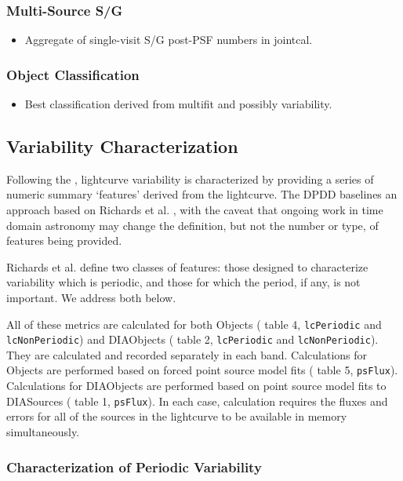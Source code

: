 \subsubsection{Multi-Source S/G}
\label{sec:acJointCalClassification}
\begin{itemize}
\item Aggregate of single-visit S/G post-PSF numbers in jointcal.
\end{itemize}
\subsubsection{Object Classification}
\label{sec:acObjectClassification}
\begin{itemize}
\item Best classification derived from multifit and possibly variability.
\end{itemize}

\subsection{Variability Characterization}
\label{sec:acVariabilityCharacterization}

Following the \DPDD{}, lightcurve variability is characterized by providing a series of numeric summary `features' derived from the lightcurve. The DPDD baselines an approach based on Richards et al. \cite{Richards11}, with the caveat that ongoing work in time domain astronomy may change the definition, but not the number or type, of features being provided.

Richards et al. define two classes of features: those designed to characterize variability which is periodic, and those for which the period, if any, is not important. We address both below.

All of these metrics are calculated for both Objects (\DPDD{} table 4, \texttt{lcPeriodic} and \texttt{lcNonPeriodic}) and DIAObjects (\DPDD{} table 2, \texttt{lcPeriodic} and \texttt{lcNonPeriodic}). They are calculated and recorded separately in each band. Calculations for Objects are performed based on forced point source model fits (\DPDD{} table 5, \texttt{psFlux}).  Calculations for DIAObjects are performed based on point source model fits to DIASources (\DPDD{} table 1, \texttt{psFlux}). In each case, calculation requires the fluxes and errors for all of the sources in the lightcurve to be available in memory simultaneously.

\subsubsection{Characterization of Periodic Variability}

